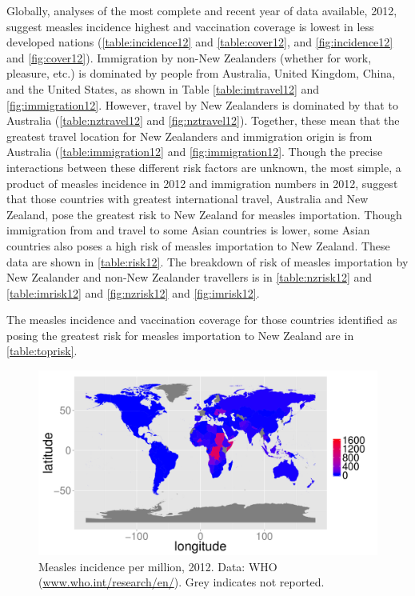 \documentclass{article}
\begin{document}
Globally, analyses of the most complete and recent year of data available, 2012, suggest measles incidence highest  and vaccination coverage is lowest in less developed nations (\autoref{table:incidence12} and \autoref{table:cover12}, and \autoref{fig:incidence12} and \autoref{fig:cover12}). Immigration by non-New Zealanders (whether for work, pleasure, etc.) is dominated by people from Australia, United Kingdom, China, and the United States, as shown in Table \autoref{table:imtravel12} and \autoref{fig:immigration12}. However, travel by New Zealanders is dominated by that to Australia (\autoref{table:nztravel12} and \autoref{fig:nztravel12}). Together, these mean that the greatest travel location for New Zealanders and immigration origin is from Australia (\autoref{table:immigration12} and \autoref{fig:immigration12}. Though the precise interactions between these different risk factors are unknown, the most simple, a product of measles incidence in 2012 and immigration numbers in 2012, suggest that those countries with greatest international travel, Australia and New Zealand, pose the greatest risk to New Zealand for measles importation. Though immigration from and travel to some Asian countries is lower, some Asian countries also poses a high risk of measles importation to New Zealand. These data are shown in \autoref{table:risk12}. The breakdown of risk of measles importation by New Zealander and non-New Zealander travellers is in \autoref{table:nzrisk12} and \autoref{table:imrisk12} and \autoref{fig:nzrisk12} and \autoref{fig:imrisk12}. 

The measles incidence and vaccination coverage for those countries identified as posing the greatest risk for measles importation to New Zealand are in \autoref{table:toprisk}.


\begin{figure}
\begin{center}
\includegraphics{draftfinalreport_v2-047}
\end{center}
\caption{Measles incidence per million, 2012. Data: WHO (\href{http://www.who.int/research/en/}{www.who.int/research/en/}). Grey indicates not reported.}
\label{fig:incidence12}
\end{figure}
\end{document}
